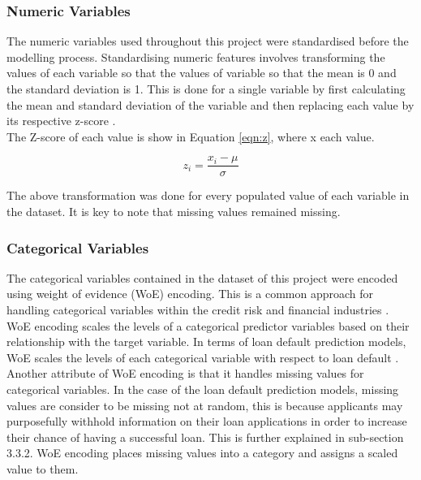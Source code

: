 \subsubsection{Numeric Variables}

The numeric variables used throughout this project were standardised before the modelling process. Standardising numeric features involves transforming the values of each variable so that the values of variable so that the mean is 0 and the standard deviation is 1. This is done for a single variable by first calculating the mean and standard deviation of the variable and then replacing each value by its respective z-score \parencite{ZScore}. \\

The Z-score of each value is show in Equation \ref{eqn:z}, where x each value. 

\vspace{10pt}

\begin{equation}\label{eqn:z}
    z_{i} = \dfrac{x_{i}-\mu}{\sigma}
\end{equation}

\vspace{10pt}

The above transformation was done for every populated value of each variable in the dataset. It is key to note that missing values remained missing.  

\subsubsection{Categorical Variables}

The categorical variables contained in the dataset of this project were encoded using weight of evidence (WoE) encoding. This is a common approach for handling categorical variables within the credit risk and financial industries \parencite{WOE}. WoE encoding scales the levels of a categorical predictor variables based on their relationship with the target variable. In terms of loan default prediction models, WoE scales the levels of each categorical variable with respect to loan default \parencite{WOE}. \\

Another attribute of WoE encoding is that it handles missing values for categorical variables. In the case of the loan default prediction models, missing values are consider to be missing not at random, this is because applicants may purposefully withhold information on their loan applications in order to increase their chance of having a successful loan. This is further explained in sub-section 3.3.2. WoE encoding places missing values into a category and assigns a scaled value to them. \\


